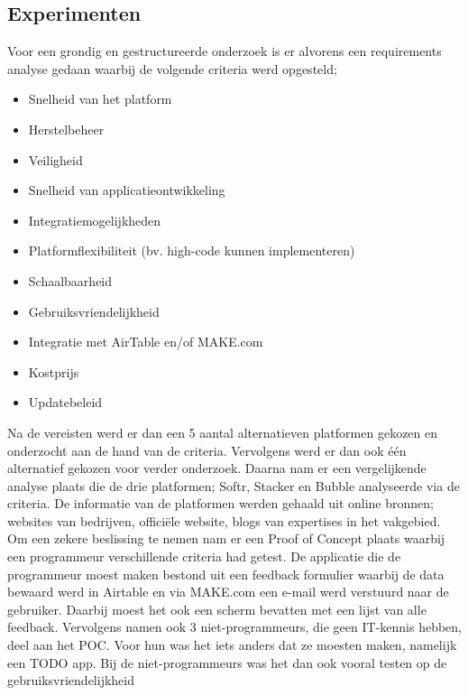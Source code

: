 \documentclass[a0,portrait]{hogent-poster}
\begin{document}
\begin{multicols}{2}
\section{Experimenten}
Voor een grondig en gestructureerde onderzoek is er alvorens een requirements analyse 
gedaan waarbij de volgende criteria werd opgesteld;
\vspace*{1cm} %
\begin{itemize}
    \item Snelheid van het platform
    \item Herstelbeheer
    \item Veiligheid
    \item Snelheid van applicatieontwikkeling
    \item Integratiemogelijkheden
    \item Platformflexibiliteit (bv. high-code kunnen implementeren)
    \item Schaalbaarheid
    \item Gebruiksvriendelijkheid
    \item Integratie met AirTable en/of MAKE.com
    \item Kostprijs
    \item Updatebeleid
\end{itemize}
\vspace*{1cm} %
Na de vereisten werd er dan een 5 aantal alternatieven 
platformen gekozen en onderzocht aan de hand van de criteria. 
Vervolgens werd er dan ook één alternatief gekozen voor verder onderzoek. 
Daarna nam er een vergelijkende analyse plaats die de drie platformen; Softr, Stacker en Bubble 
analyseerde via de criteria. De informatie van de platformen werden gehaald uit online bronnen; 
websites van bedrijven, officiële website, blogs van expertises in het vakgebied. Om een zekere 
beslissing te nemen nam er een Proof of Concept plaats waarbij een programmeur verschillende 
criteria had getest. De applicatie die de programmeur moest maken bestond uit een feedback 
formulier waarbij de data bewaard werd in Airtable en via MAKE.com een e-mail werd verstuurd 
naar de gebruiker. Daarbij moest het ook een scherm bevatten met een lijst  van alle feedback. 
Vervolgens namen ook 3 niet-programmeurs, die geen IT-kennis hebben, deel aan het POC. 
Voor hun was het iets anders dat ze moesten maken, namelijk een TODO app. 
Bij de niet-programmeurs was het dan ook vooral testen op de gebruiksvriendelijkheid



\end{multicols}
\end{document}
